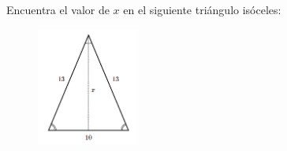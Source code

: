 \question[15] Encuentra el valor de $x$ en el siguiente triángulo isóceles:
\begin{figure}[H]
    \begin{center}
        \includegraphics[width=0.3\textwidth]{../images/pitagoras7.png}
    \end{center}
    \caption{}
    \label{fig:pitagoras7}
\end{figure}